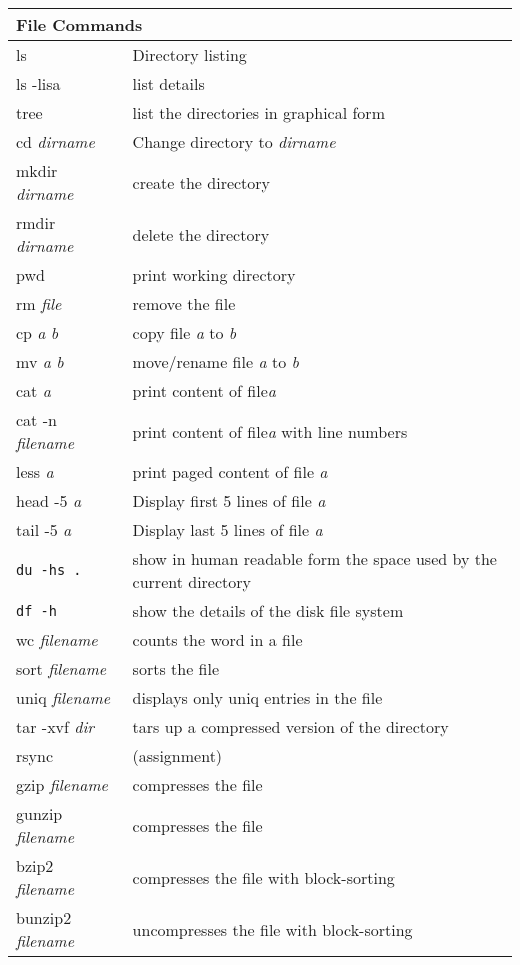 \begin{center}
\begin{longtable}{|p{4cm}|p{8cm}|}
  \hline
  \multicolumn{2}{|l|}{\cellcolor{blue!15} File Commands}\\
  \hline
  ls & Directory listing\\
  ls -lisa & list details \\
  tree & list the directories in graphical form \\
  cd \emph{dirname} & Change directory to \emph{dirname} \\
  mkdir \emph{dirname} & create the directory \\
  rmdir \emph{dirname} & delete the directory \\
  pwd & print working directory \\
  rm \emph{file} & remove the file \\
  cp \emph{a} \emph{b} & copy file \emph{a} to \emph{b} \\
  mv \emph{a} \emph{b} & move/rename file \emph{a} to \emph{b}\\
  cat \emph{a} & print content of file\emph{a}\\
  cat -n \textit{filename}&  print content of file\emph{a} with line numbers\\
  less \emph{a} & print paged content of file \emph{a}\\
  head -5 \emph{a} & Display first 5 lines of file \emph{a}\\
  tail -5 \emph{a} & Display last 5 lines of file \emph{a}\\
  \verb|du -hs .| & show in human readable form the space used by the current
             directory\\
  \verb|df -h| & show the details of the disk file system \\
  wc \textit{filename}&  counts the word in a file \\
  sort \textit{filename} &  sorts the file \\
  uniq \textit{filename} &  displays only uniq entries in the file \\
  tar -xvf \textit{dir} &  tars up a compressed version of the directory \\
  rsync &  (assignment) \\
  gzip  \textit{filename}&  compresses the file \\
  gunzip  \textit{filename}& compresses the file \\
  bzip2 \textit{filename} &  compresses  the file with block-sorting \\
  bunzip2 \textit{filename} &  uncompresses  the file with block-sorting \\

\end{longtable}
\end{center}
